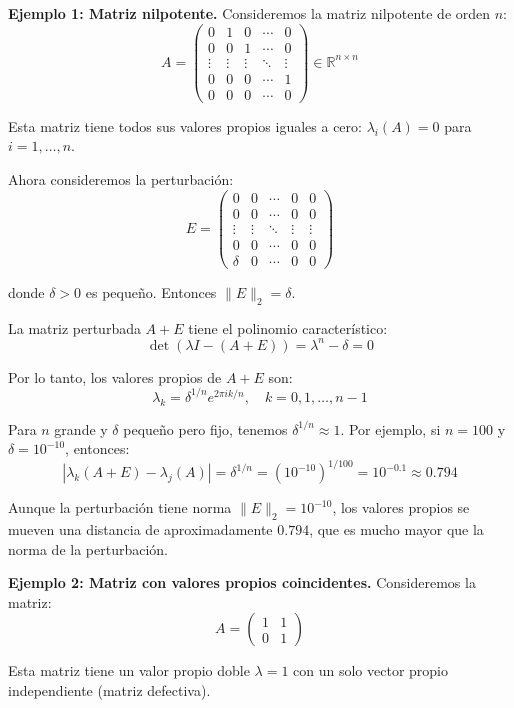 \documentclass[12pt]{article}
\begin{document}
\textbf{Ejemplo 1: Matriz nilpotente.}
Consideremos la matriz nilpotente de orden $n$:
\[
A = \begin{pmatrix}
0 & 1 & 0 & \cdots & 0 \\
0 & 0 & 1 & \cdots & 0 \\
\vdots & \vdots & \vdots & \ddots & \vdots \\
0 & 0 & 0 & \cdots & 1 \\
0 & 0 & 0 & \cdots & 0
\end{pmatrix} \in \mathbb{R}^{n \times n}
\]

Esta matriz tiene todos sus valores propios iguales a cero: $\lambda_i(A) = 0$ para $i = 1, \ldots, n$.

Ahora consideremos la perturbación:
\[
E = \begin{pmatrix}
0 & 0 & \cdots & 0 & 0 \\
0 & 0 & \cdots & 0 & 0 \\
\vdots & \vdots & \ddots & \vdots & \vdots \\
0 & 0 & \cdots & 0 & 0 \\
\delta & 0 & \cdots & 0 & 0
\end{pmatrix}
\]

donde $\delta > 0$ es pequeño. Entonces $\|E\|_2 = \delta$.

La matriz perturbada $A + E$ tiene el polinomio característico:
\[
\det(\lambda I - (A + E)) = \lambda^n - \delta = 0
\]

Por lo tanto, los valores propios de $A + E$ son:
\[
\lambda_k = \delta^{1/n} e^{2\pi i k/n}, \quad k = 0, 1, \ldots, n-1
\]

Para $n$ grande y $\delta$ pequeño pero fijo, tenemos $\delta^{1/n} \approx 1$. Por ejemplo, si $n = 100$ y $\delta = 10^{-10}$, entonces:
\[
|\lambda_k(A + E) - \lambda_j(A)| = \delta^{1/n} = (10^{-10})^{1/100} = 10^{-0.1} \approx 0.794
\]

Aunque la perturbación tiene norma $\|E\|_2 = 10^{-10}$, los valores propios se mueven una distancia de aproximadamente $0.794$, que es mucho mayor que la norma de la perturbación.

\textbf{Ejemplo 2: Matriz con valores propios coincidentes.}
Consideremos la matriz:
\[
A = \begin{pmatrix}
1 & 1 \\
0 & 1
\end{pmatrix}
\]

Esta matriz tiene un valor propio doble $\lambda = 1$ con un solo vector propio independiente (matriz defectiva).
\end{document}
